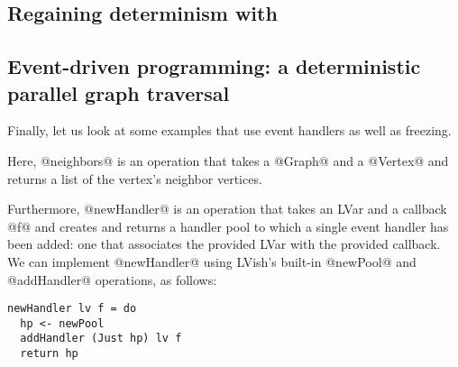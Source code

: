
\singlespacing

\doublespacing

\subsection{Regaining determinism with }


\singlespacing

\doublespacing

\subsection{Event-driven programming: a deterministic parallel graph traversal}

Finally, let us look at some examples that use event handlers as well
as freezing.

Here, @neighbors@ is an operation that takes a @Graph@ and a @Vertex@
and returns a list of the vertex's neighbor vertices.

Furthermore, @newHandler@ is an operation that takes an LVar and a
callback @f@ and creates and returns a handler pool to which a single
event handler has been added: one that associates the provided LVar
with the provided callback.  We can implement @newHandler@ using
LVish's built-in @newPool@ and @addHandler@ operations, as follows:

\singlespacing
\begin{lstlisting}
newHandler lv f = do
  hp <- newPool
  addHandler (Just hp) lv f
  return hp
\end{lstlisting}
\doublespacing

\singlespacing

\doublespacing

\singlespacing

\doublespacing

